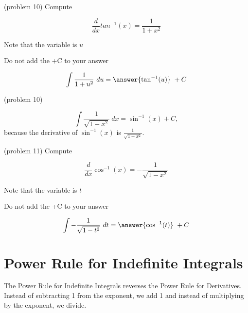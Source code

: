 \documentclass[handout]{ximera}
\begin{document}
\begin{problem} (problem 10) %
Compute 

\begin{hint}
\[
\frac{d}{dx} tan^{-1}(x) = \frac{1}{1+x^2}
\]
\end{hint}
\begin{hint}
Note that the variable is $u$
\end{hint}
\begin{hint}
\begin{center}
Do not add the +C to your answer
\end{center}
\end{hint}

\[
\int \frac{1}{1+u^2} \ du =
\answer{\tan^{-1}(u)} \ + C
\]
\end{problem}(problem 10)


\begin{example}[example 11]
\[
\int \frac{1}{\sqrt{1 - x^2}} \ dx = \sin^{-1}(x) + C,
\]
because the derivative of $\sin^{-1}(x)$ 
is $\frac{1}{\sqrt{1 - x^2}}$.

\end{example}

\begin{problem}(problem 11)
Compute 

\begin{hint}
\[
\frac{d}{dx} \cos^{-1}(x) = -\frac{1}{\sqrt{1 - x^2}}
\]
\end{hint}
\begin{hint}
Note that the variable is $t$
\end{hint}
\begin{hint}
\begin{center}
Do not add the +C to your answer
\end{center}
\end{hint}

\[
\int -\frac{1}{\sqrt{1 - t^2}} \ dt =
\answer{\cos^{-1}(t)} \ + C
\]
\end{problem}

\section{Power Rule for Indefinite Integrals}

The Power Rule for Indefinite Integrals reverses the Power Rule for Derivatives.
Instead of subtracting 1 from the exponent, we add 1 and instead of multiplying by the exponent, we divide.
\end{document}

